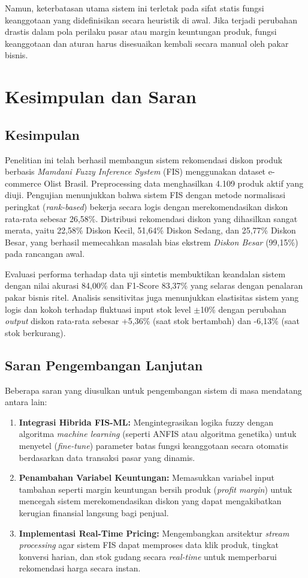 \documentclass[conference]{IEEEtran}
\begin{document}
Namun, keterbatasan utama sistem ini terletak pada sifat statis fungsi keanggotaan yang didefinisikan secara heuristik di awal. Jika terjadi perubahan drastis dalam pola perilaku pasar atau margin keuntungan produk, fungsi keanggotaan dan aturan harus disesuaikan kembali secara manual oleh pakar bisnis.

\section{Kesimpulan dan Saran}

\subsection{Kesimpulan}
Penelitian ini telah berhasil membangun sistem rekomendasi diskon produk berbasis \textit{Mamdani Fuzzy Inference System} (FIS) menggunakan dataset e-commerce Olist Brasil. Preprocessing data menghasilkan 4.109 produk aktif yang diuji. Pengujian menunjukkan bahwa sistem FIS dengan metode normalisasi peringkat (\textit{rank-based}) bekerja secara logis dengan merekomendasikan diskon rata-rata sebesar 26,58\%. Distribusi rekomendasi diskon yang dihasilkan sangat merata, yaitu 22,58\% Diskon Kecil, 51,64\% Diskon Sedang, dan 25,77\% Diskon Besar, yang berhasil memecahkan masalah bias ekstrem \textit{Diskon Besar} (99,15\%) pada rancangan awal.

Evaluasi performa terhadap data uji sintetis membuktikan keandalan sistem dengan nilai akurasi 84,00\% dan F1-Score 83,37\% yang selaras dengan penalaran pakar bisnis ritel. Analisis sensitivitas juga menunjukkan elastisitas sistem yang logis dan kokoh terhadap fluktuasi input stok level $\pm$10\% dengan perubahan \textit{output} diskon rata-rata sebesar +5,36\% (saat stok bertambah) dan -6,13\% (saat stok berkurang).

\subsection{Saran Pengembangan Lanjutan}
Beberapa saran yang diusulkan untuk pengembangan sistem di masa mendatang antara lain:
\begin{enumerate}
    \item \textbf{Integrasi Hibrida FIS-ML:} Mengintegrasikan logika fuzzy dengan algoritma \textit{machine learning} (seperti ANFIS atau algoritma genetika) untuk menyetel (\textit{fine-tune}) parameter batas fungsi keanggotaan secara otomatis berdasarkan data transaksi pasar yang dinamis.
    \item \textbf{Penambahan Variabel Keuntungan:} Memasukkan variabel input tambahan seperti margin keuntungan bersih produk (\textit{profit margin}) untuk mencegah sistem merekomendasikan diskon yang dapat mengakibatkan kerugian finansial langsung bagi penjual.
    \item \textbf{Implementasi Real-Time Pricing:} Mengembangkan arsitektur \textit{stream processing} agar sistem FIS dapat memproses data klik produk, tingkat konversi harian, dan stok gudang secara \textit{real-time} untuk memperbarui rekomendasi harga secara instan.
\end{enumerate}
\end{document}
